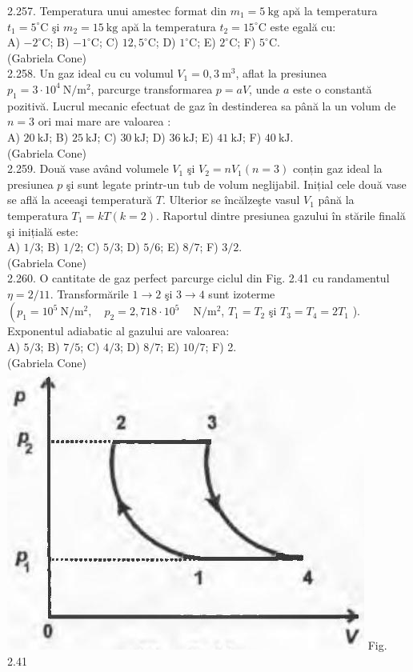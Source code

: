 2.257. Temperatura unui amestec format din $m_{1}=5 \mathrm{~kg}$ apă la temperatura $t_{1}=5^{\circ} \mathrm{C}$ şi $m_{2}=15 \mathrm{~kg}$ apă la temperatura $t_{2}=15^{\circ} \mathrm{C}$ este egală cu:\\ A) $-2^{\circ} \mathrm{C}$; B) $-1^{\circ} \mathrm{C}$; C) $12,5^{\circ} \mathrm{C}$; D) $1^{\circ} \mathrm{C}$; E) $2^{\circ} \mathrm{C}$; F) $5^{\circ} \mathrm{C}$.\\ (Gabriela Cone)\\

2.258. Un gaz ideal cu cu volumul $V_{1}=0,3 \mathrm{~m}^{3}$, aflat la presiunea $p_{1}=3 \cdot 10^{4} \mathrm{~N} / \mathrm{m}^{2}$, parcurge transformarea $p=a V$, unde $a$ este o constantă pozitivă. Lucrul mecanic efectuat de gaz în destinderea sa până la un volum de $n=3$ ori mai mare are valoarea :\\ A) $20 \mathrm{~kJ}$; B) $25 \mathrm{~kJ}$; C) $30 \mathrm{~kJ}$; D) $36 \mathrm{~kJ}$; E) $41 \mathrm{~kJ}$; F) $40 \mathrm{~kJ}$.\\ (Gabriela Cone)\\

2.259. Două vase având volumele $V_{1}$ şi $V_{2}=n V_{1}(n=3)$ conțin gaz ideal la presiunea $p$ şi sunt legate printr-un tub de volum neglijabil. Inițial cele două vase se află la aceeaşi temperatură $T$. Ulterior se încălzeşte vasul $V_{1}$ până la temperatura $T_{1}=k T(k=2)$. Raportul dintre presiunea gazului în stările finală şi inițială este:\\ A) $1 / 3$; B) $1 / 2$; C) $5 / 3$; D) $5 / 6$; E) $8 / 7$; F) $3 / 2$.\\ (Gabriela Cone)\\

2.260. O cantitate de gaz perfect parcurge ciclul din Fig. 2.41 cu randamentul $\eta=2 / 11$. Transformările $1 \rightarrow 2$ şi $3 \rightarrow 4$ sunt izoterme $\left(p_{1}=10^{5} \mathrm{~N} / \mathrm{m}^{2}, \quad p_{2}=2,718 \cdot 10^{5} \quad \mathrm{~N} / \mathrm{m}^{2}\right.$, $T_{1}=T_{2}$ şi $T_{3}=T_{4}=2 T_{1}$ ). Exponentul adiabatic al gazului are valoarea:\\ A) $5 / 3$; B) $7 / 5$; C) $4 / 3$; D) $8 / 7$; E) $10 / 7$; F) 2.\\ (Gabriela Cone)\\ \includegraphics[width=0.4\linewidth]{images/2025_07_01_5b3ff9fa0d508c8e9f17g-132} Fig. 2.41\\

